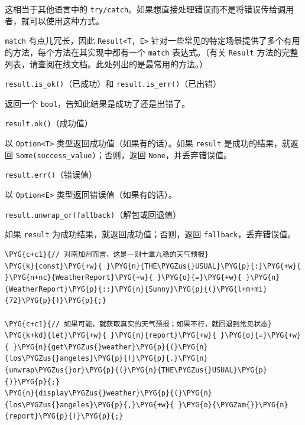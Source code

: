 这相当于其他语言中的 \texttt{try/catch}。如果想直接处理错误而不是将错误传给调用者，就可以使用这种方式。

\texttt{match} 有点儿冗长，因此 \texttt{Result<T, E>} 针对一些常见的特定场景提供了多个有用的方法，每个方法在其实现中都有一个 \texttt{match} 表达式。（有关 \texttt{Result} 方法的完整列表，请查阅在线文档。此处列出的是最常用的方法。）

\begin{myNote}
\texttt{result.is\_ok()}（已成功）和 \texttt{result.is\_err()}（已出错）
\end{myNote}

返回一个 \texttt{bool}，告知此结果是成功了还是出错了。

\begin{mySidenote}
\texttt{result.ok()}（成功值）
\end{mySidenote}

以 \texttt{Option<T>} 类型返回成功值（如果有的话）。如果 \texttt{result} 是成功的结果，就返回 \texttt{Some(success\_value)}；否则，返回 \texttt{None}，并丢弃错误值。

\begin{mySidenote}
\texttt{result.err()}（错误值）
\end{mySidenote}

以 \texttt{Option<E>} 类型返回错误值（如果有的话）。

\begin{myNote}
\texttt{result.unwrap\_or(fallback)}（解包或回退值）
\end{myNote}

如果 \texttt{result} 为成功结果，就返回成功值；否则，返回 \texttt{fallback}，丢弃错误值。

\begin{Verbatim}[commandchars=\\\{\},breaklines=true,breakanywhere=true,fontsize=\codefont,xleftmargin=17bp]
\PYG{c+c1}{// 对南加州而言，这是一则十拿九稳的天气预报}
\PYG{k}{const}\PYG{+w}{ }\PYG{n}{THE\PYGZus{}USUAL}\PYG{p}{:}\PYG{+w}{ }\PYG{n+nc}{WeatherReport}\PYG{+w}{ }\PYG{o}{=}\PYG{+w}{ }\PYG{n}{WeatherReport}\PYG{p}{::}\PYG{n}{Sunny}\PYG{p}{(}\PYG{l+m+mi}{72}\PYG{p}{)}\PYG{p}{;}

\PYG{c+c1}{// 如果可能，就获取真实的天气预报；如果不行，就回退到常见状态}
\PYG{k+kd}{let}\PYG{+w}{ }\PYG{n}{report}\PYG{+w}{ }\PYG{o}{=}\PYG{+w}{ }\PYG{n}{get\PYGZus{}weather}\PYG{p}{(}\PYG{n}{los\PYGZus{}angeles}\PYG{p}{)}\PYG{p}{.}\PYG{n}{unwrap\PYGZus{}or}\PYG{p}{(}\PYG{n}{THE\PYGZus{}USUAL}\PYG{p}{)}\PYG{p}{;}
\PYG{n}{display\PYGZus{}weather}\PYG{p}{(}\PYG{n}{los\PYGZus{}angeles}\PYG{p}{,}\PYG{+w}{ }\PYG{o}{\PYGZam{}}\PYG{n}{report}\PYG{p}{)}\PYG{p}{;}
\end{Verbatim}

